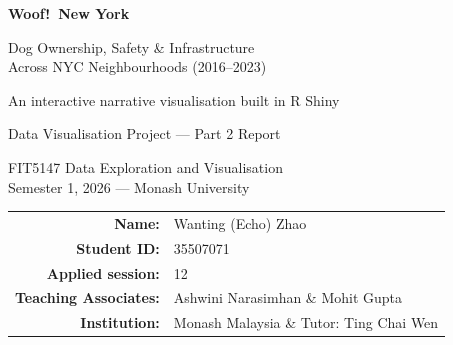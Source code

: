 
\begin{titlepage}
\centering
\vspace*{2.2cm}
{\Huge\bfseries\color{woof} Woof!\ New York\par}
\vspace{0.5cm}
{\LARGE\color{woofdark} Dog Ownership, Safety \& Infrastructure\\[3pt] Across NYC Neighbourhoods (2016--2023)\par}
\vspace{1.0cm}
{\large An interactive narrative visualisation built in R Shiny\par}
\vspace{2.0cm}
{\large Data Visualisation Project --- Part 2 Report\par}
{\large FIT5147 Data Exploration and Visualisation\\[2pt] Semester 1, 2026 --- Monash University\par}
\vfill
{\large
\begin{tabular}{rl}
\textbf{Name:} & Wanting (Echo) Zhao\\[3pt]
\textbf{Student ID:} & 35507071\\[3pt]
\textbf{Applied session:} & 12\\[3pt]
\textbf{Teaching Associates:} & Ashwini Narasimhan \& Mohit Gupta\\
\textbf{Institution:} & Monash Malaysia \& Tutor: Ting Chai Wen\\
\end{tabular}\par}
\vspace{1.5cm}
\end{titlepage}
